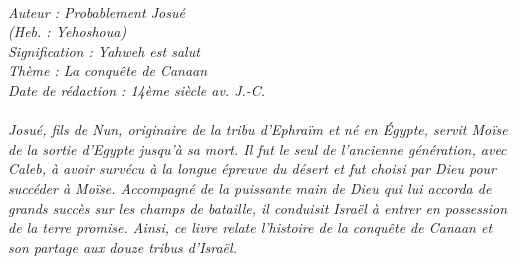 \BFont
\noindent\hrulefill
{\footnotesize
\textit{
\bigskip
{\centering{}
\\Auteur : Probablement Josué
\\(Heb. : Yehoshoua)
\\Signification : Yahweh est salut
\\Thème : La conquête de Canaan
\\Date de rédaction : 14ème siècle av. J.-C.\\}
}
\textit{
\\Josué, fils de Nun, originaire de la tribu d’Ephraïm et né en Égypte, servit Moïse de la sortie d’Egypte jusqu’à sa mort. Il fut le seul de l’ancienne génération, avec Caleb, à avoir survécu à la longue épreuve du désert et fut choisi par Dieu pour succéder à Moïse. Accompagné de la puissante main de Dieu qui lui accorda de grands succès sur les champs de bataille, il conduisit Israël à entrer en possession de la terre promise. Ainsi, ce livre relate l’histoire de la conquête de Canaan et son partage aux douze tribus d’Israël.\bigskip
}
}
\par\nobreak\noindent\hrulefill
